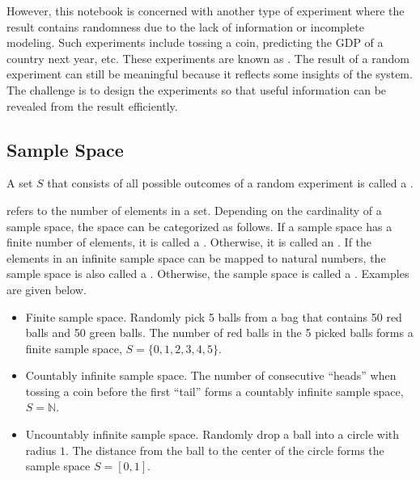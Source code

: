 However, this notebook is concerned with another type of experiment where the result contains randomness due to the lack of information or incomplete modeling. Such experiments include tossing a coin, predicting the GDP of a country next year, etc. These experiments are known as . The result of a random experiment can still be meaningful because it reflects some insights of the system. The challenge is to design the experiments so that useful information can be revealed from the result efficiently.

\subsection{Sample Space}

A set $S$ that consists of all possible outcomes of a random experiment is called a .

 refers to the number of elements in a set. Depending on the cardinality of a sample space, the space can be categorized as follows. If a sample space has a finite number of elements, it is called a . Otherwise, it is called an . If the elements in an infinite sample space can be mapped to natural numbers, the sample space is also called a . Otherwise, the sample space is called a . Examples are given below.
\begin{itemize}
	\item Finite sample space. Randomly pick 5 balls from a bag that contains 50 red balls and 50 green balls. The number of red balls in the 5 picked balls forms a finite sample space, $S = \{0, 1, 2, 3, 4, 5\}$.
	\item Countably infinite sample space. The number of consecutive ``heads'' when tossing a coin before the first ``tail'' forms a countably infinite sample space, $S = \mathbb{N}$.
	\item Uncountably infinite sample space. Randomly drop a ball into a circle with radius $1$. The distance from the ball to the center of the circle forms the sample space $S=[0,1]$.
\end{itemize}

